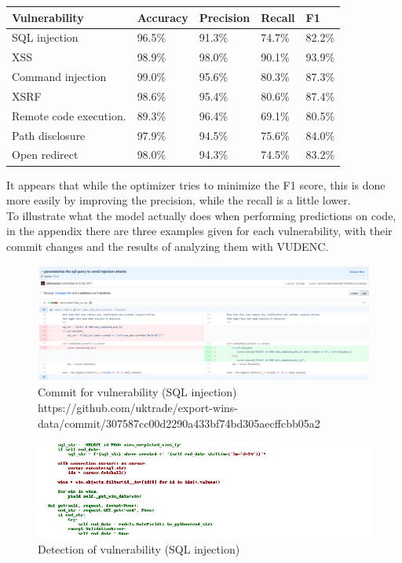 \documentclass[
a4paper,
pagesize,
pdftex,
12pt,
twoside, %
BCOR=5mm, %
ngerman,
fleqn,
final,
]{scrartcl}
\begin{document}
	\begin{tabular}{ | p{5cm} || p{2cm}|p{2cm}|p{2cm}|p{2cm}|  }
		\hline
		\textbf{Vulnerability} & \textbf{Accuracy} & \textbf{Precision} & \textbf{Recall} & \textbf{F1} \\
		\hline
		SQL injection & 96.5\% & 91.3\% & 74.7\% & 82.2\% \\
		XSS & 98.9\% & 98.0\% & 90.1\% & 93.9\% \\
		Command injection & 99.0\%  & 95.6\% & 80.3\% & 87.3\%  \\
		XSRF & 98.6\% & 95.4\% & 80.6\% & 87.4\% \\
		Remote code execution.  & 89.3\% & 96.4\% & 69.1\% & 80.5\%\\
		Path disclosure & 97.9\% & 94.5\% & 75.6\% & 84.0\% \\
		Open redirect & 98.0\% & 94.3\% & 74.5\% & 83.2\%  \\
		\hline
		\hline
	\end{tabular}
	
	It appears that while the optimizer tries to minimize the F1 score, this is done more easily by improving the precision, while the recall is a little lower.\\	
	 To illustrate what the model actually does when performing predictions on code, in the appendix there are three examples given for each vulnerability, with their commit changes and the results of analyzing them with VUDENC.
	
	
	\begin{figure}[H]
		\centering
		\includegraphics[width=\linewidth]{Images/sqlB}
		\caption{Commit for vulnerability (SQL injection) \newline \scriptsize{https://github.com/uktrade/export-wins-data/commit/307587cc00d2290a433bf74bd305aecffcbb05a2}}
		\label{fig:sqlB}
	\end{figure}
	\begin{figure}[H]
		\centering
		\includegraphics[width=\linewidth]{Images/sqlBr}
		\caption{Detection of vulnerability (SQL injection)}
		\label{fig:sqlBr}
	\end{figure}
\end{document}
